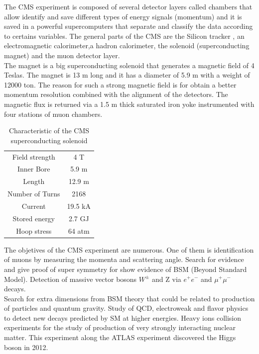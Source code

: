 \begin{linenumbers}
The CMS experiment is composed of several detector layers called chambers that allow identify and save different types of energy signals (momentum) and it is saved in a powerful supercomputers that separate and classify the data according to certains variables. The general parts of the CMS are the Silicon tracker , an electromagnetic calorimeter,a hadron calorimeter, the solenoid (superconducting magnet) and the muon detector layer. \\

The magnet is a big superconducting solenoid that generates a magnetic field of 4 Teslas. The magnet is 13 m long and it has a diameter of 5.9 m with a weight of 12000 ton. The reason for such a strong magnetic field is for obtain a better momentum resolution combined with the alignment of the detectors.
The magnetic flux is returned via a 1.5 m thick saturated iron yoke instrumented with four stations of muon
chambers.

\begin{table}[ht]
	\caption{Characteristic of the CMS superconducting solenoid \cite{cms-manual}}
	\centering
	\begin{tabular}{|c|c|}
		\hline
		Field strength & 4 T \\
		Inner Bore & 5.9 m \\
		Length & 12.9 m\\
		Number of Turns & 2168\\
		Current & 19.5 kA\\
		Stored energy & 2.7 GJ\\
		Hoop stress & 64 atm\\
		\hline
	\end{tabular}
	\label{tab:my_label}
\end{table}







 The objetives of the CMS experiment are numerous. One of them is
identification of muons by measuring the momenta and scattering angle. Search for evidence  and give proof of super symmetry  for show evidence of BSM (Beyond Standard Model). Detection of massive vector bosons $W^\pm$ and Z via $e^+e^-$ and $\mu^+ \mu^-$ decays.\\
Search for extra dimensions from BSM theory that could be related to production of particles and quantum gravity. Study of QCD, electroweak and flavor physics to detect new decays predicted by SM at higher energies. Heavy ions collision experiments for the study of production of  very strongly interacting nuclear matter\cite{cms-manual}.
This experiment along the ATLAS experiment discovered the Higgs boson in 2012.
\\



\end{linenumbers}
